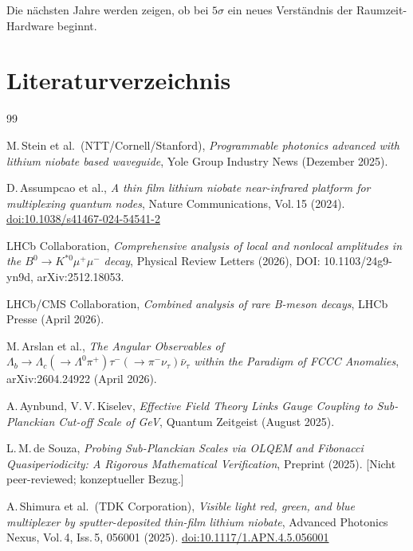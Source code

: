 \begin{keybox}
Die nächsten Jahre werden zeigen, ob bei $5\sigma$ ein neues Verständnis
der Raumzeit-Hardware beginnt.
\end{keybox}

\newpage
\section*{Literaturverzeichnis}

\begin{thebibliography}{99}

M.\,Stein et al.\ (NTT/Cornell/Stanford),
\textit{Programmable photonics advanced with lithium niobate based waveguide},
Yole Group Industry News (Dezember 2025).

D.\,Assumpcao et al.,
\textit{A thin film lithium niobate near-infrared platform for multiplexing quantum nodes},
Nature Communications, Vol.\,15 (2024).
\href{https://doi.org/10.1038/s41467-024-54541-2}{doi:10.1038/s41467-024-54541-2}

LHCb Collaboration,
\textit{Comprehensive analysis of local and nonlocal amplitudes in the
$B^0 \to K^{*0}\mu^+\mu^-$ decay},
Physical Review Letters (2026),
DOI: 10.1103/24g9-yn9d,
arXiv:2512.18053.

LHCb/CMS Collaboration,
\textit{Combined analysis of rare B-meson decays},
LHCb Presse (April 2026).

M.\,Arslan et al.,
\textit{The Angular Observables of $\Lambda_b \to \Lambda_c(\to \Lambda^0\pi^+)
\tau^-(\to\pi^-\nu_\tau)\bar{\nu}_\tau$ within the Paradigm of FCCC Anomalies},
arXiv:2604.24922 (April 2026).

A.\,Aynbund, V.\,V.\,Kiselev,
\textit{Effective Field Theory Links Gauge Coupling to Sub-Planckian Cut-off Scale of GeV},
Quantum Zeitgeist (August 2025).

L.\,M.\,de Souza,
\textit{Probing Sub-Planckian Scales via OLQEM and Fibonacci Quasiperiodicity:
A Rigorous Mathematical Verification},
Preprint (2025). [Nicht peer-reviewed; konzeptueller Bezug.]

A.\,Shimura et al.\ (TDK Corporation),
\textit{Visible light red, green, and blue multiplexer by sputter-deposited
thin-film lithium niobate},
Advanced Photonics Nexus, Vol.\,4, Iss.\,5, 056001 (2025).
\href{https://doi.org/10.1117/1.APN.4.5.056001}{doi:10.1117/1.APN.4.5.056001}

\end{thebibliography}
